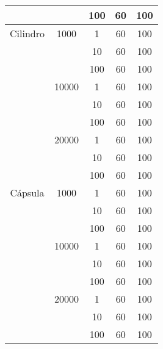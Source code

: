 \begin{center}
\begin{tabular}{| c | c | c | c | c |}
&  & 100 & 60 & 100\\ \hline
Cilindro & 1000 & 1 & 60 & 100\\ \hline
&  & 10 & 60 & 100\\ \hline
&  & 100 & 60 & 100\\ \hline
 & 10000 & 1 & 60 & 100\\ \hline
 &  & 10 & 60 & 100\\ \hline
&  & 100 & 60 & 100\\ \hline
 & 20000 & 1 & 60 & 100\\ \hline
 &  & 10 & 60 & 100\\ \hline
&  & 100 & 60 & 100\\ \hline
Cápsula & 1000 & 1 & 60 & 100\\ \hline
&  & 10 & 60 & 100\\ \hline
&  & 100 & 60 & 100\\ \hline
 & 10000 & 1 & 60 & 100\\ \hline
 &  & 10 & 60 & 100\\ \hline
&  & 100 & 60 & 100\\ \hline
 & 20000 & 1 & 60 & 100\\ \hline
 &  & 10 & 60 & 100\\ \hline
&  & 100 & 60 & 100\\ \hline
\end{tabular}
\end{center}

